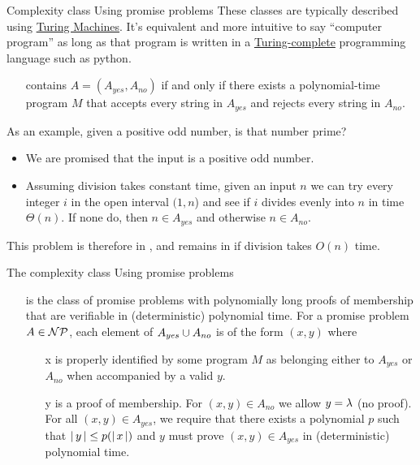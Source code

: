 \begin{frame}{Complexity class }{Using promise problems}
These classes are typically described using \href{https://en.wikipedia.org/wiki/Turing_machine}{Turing Machines}.  It's equivalent and more intuitive to say ``computer program'' as long as that program is written in a \href{https://en.wikipedia.org/wiki/Turing_completeness}{Turing-complete} programming language such as python.
\begin{itemize}
    \item[\CompClass{P}] contains $A=(A_{yes},A_{no})$ if and only if there exists a polynomial-time program $M$ that accepts every string in $A_{yes}$ and rejects every string in $A_{no}$.
\end{itemize}
As an example, given a positive odd number, is that number prime?
\begin{itemize}
    \item We are promised that the input is a positive odd number.
    \item Assuming division takes constant time, given an input $n$ we can try every integer $i$ in the open interval $(1,n$) and see if $i$ divides evenly into $n$ in time~$\Theta(n)$.  If none do, then
    $n\in A_{yes}$ and otherwise $n\in A_{no}$.
\end{itemize}
This problem is therefore in , and remains in  if division takes $O(n)$ time.
\end{frame}
\begin{frame}{The complexity class }{Using promise problems}

\begin{itemize}
    \item[\CompClass{NP}] is the class of promise problems with polynomially long proofs of membership that are verifiable in (deterministic) polynomial time.   For a promise problem $A\in\mathcal{NP}$, each element of $A_{yes} \cup A_{no}$ is of the form $(x,y)$ where
    \begin{itemize}
        \item[x] is properly identified by some program $M$ as belonging either to $A_{yes}$ or $A_{no}$ when accompanied by a valid $y$.
        \item[y] is a proof of membership.  For $(x,y)\in A_{no}$ we allow $y=\lambda{}$ (no proof).  For all $(x,y)\in A_{yes}$, we require that there exists a polynomial $p$ such that $|\,y\,| \leq p(|\,x\,|)$ and $y$ must prove $(x,y)\in A_{yes}$ in (deterministic) polynomial time.
    \end{itemize}
    
\end{itemize}
\end{frame}
